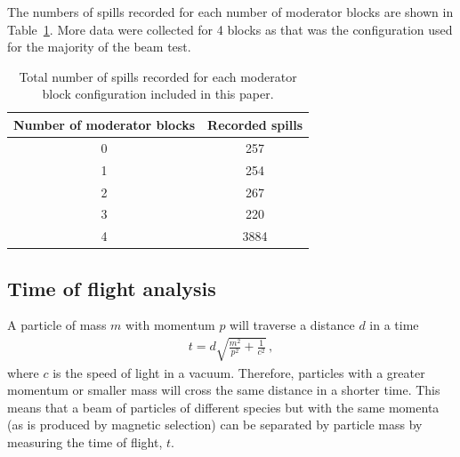 The numbers of spills recorded for each number of moderator blocks are shown in Table~\ref{tab:spills}.
More data were collected for 4 blocks as that was the configuration used for the majority of the beam test.

\begin{table}
  \centering
  \caption{Total number of spills recorded for each moderator block configuration included in this paper.}
  \begin{tabular}{c|c}
    \hline
    \hline
    Number of moderator blocks & Recorded spills \\
    \hline
    0 & 257 \\
    1 & 254 \\
    2 & 267 \\
    3 & 220 \\
    4 & 3884 \\
    \hline
  \end{tabular}
  \label{tab:spills}
\end{table}


\subsection{Time of flight analysis}
\label{timeofflightanalysissubsec}


A particle of mass $m$ with momentum $p$ will traverse a distance $d$ in a time
\begin{align}
  t = d \sqrt{\frac{m^2}{p^2} + \frac{1}{c^2}} \,, 
\end{align}
where $c$ is the speed of light in a vacuum.
Therefore, particles with a greater momentum or smaller mass will cross the same distance in a shorter time.
This means that a beam of particles of different species but with the same momenta (as is produced by magnetic selection) can be separated by particle mass by measuring the time of flight, $t$.

